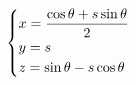 \documentclass[preview]{standalone}
\begin{document}
\begin{align*}
\special{dvisvgm:raw <g id='unique000'>}\begin{cases}x=\dfrac{\cos\theta+s\sin\theta}{2}\\y=s\\z=\sin\theta-s\cos\theta\end{cases}\special{dvisvgm:raw </g>}
\end{align*}
\end{document}
